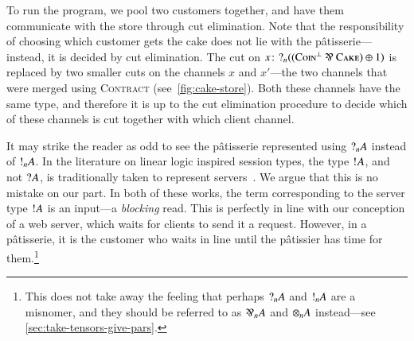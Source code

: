 \documentclass[10pt,a4paper,twocolumn,notitlepage]{article}
\begin{document}
To run the program, we pool two customers together, and have them communicate
with the store through cut elimination. Note that the responsibility of choosing
which customer gets the cake does not lie with the p\^{a}tisserie---instead, it
is decided by cut elimination. The cut on
$\tm[x]{\give[n]((\coin^\bot\parr\cake)\plus{1})}$ is replaced by two smaller
cuts on the channels $x$ and $x'$---the two channels that were merged using
\textsc{Contract} (see~\autoref{fig:cake-store}). Both these channels have the same
type, and therefore it is up to the cut elimination procedure to decide which of
these channels is cut together with which client channel.

It may strike the reader as odd to see the p\^{a}tisserie represented using
$\give[n]{A}$ instead of $\take[n]{A}$.
In the literature on linear logic inspired session types, the type $\take{A}$,
and not $\give{A}$, is traditionally taken to represent
servers~\citep{caires2010,wadler2012}.
We argue that this is no mistake on our part.
In both of these works, the term corresponding to the server type $\take{A}$ is
an input---a \emph{blocking} read.
This is perfectly in line with our conception of a web server, which waits for
clients to send it a request.
However, in a p\^{a}tisserie, it is the customer who waits in line until the
p\^{a}tissier has time for them.\footnote{
  This does not take away the feeling that perhaps $\give[n]{A}$ and
  $\take[n]{A}$ are a misnomer, and they should be referred to as
  ${\parr}_{n}{A}$ and ${\mult}_{n}{A}$ instead---see
  \autoref{sec:take-tensors-give-pars}. 
}
\end{document}
